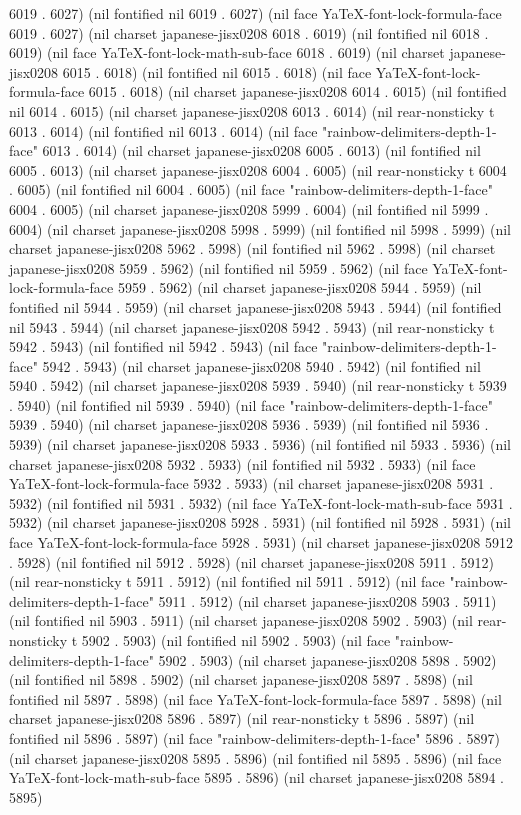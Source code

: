 6019 . 6027) (nil fontified nil 6019 . 6027) (nil face YaTeX-font-lock-formula-face 6019 . 6027) (nil charset japanese-jisx0208 6018 . 6019) (nil fontified nil 6018 . 6019) (nil face YaTeX-font-lock-math-sub-face 6018 . 6019) (nil charset japanese-jisx0208 6015 . 6018) (nil fontified nil 6015 . 6018) (nil face YaTeX-font-lock-formula-face 6015 . 6018) (nil charset japanese-jisx0208 6014 . 6015) (nil fontified nil 6014 . 6015) (nil charset japanese-jisx0208 6013 . 6014) (nil rear-nonsticky t 6013 . 6014) (nil fontified nil 6013 . 6014) (nil face "rainbow-delimiters-depth-1-face" 6013 . 6014) (nil charset japanese-jisx0208 6005 . 6013) (nil fontified nil 6005 . 6013) (nil charset japanese-jisx0208 6004 . 6005) (nil rear-nonsticky t 6004 . 6005) (nil fontified nil 6004 . 6005) (nil face "rainbow-delimiters-depth-1-face" 6004 . 6005) (nil charset japanese-jisx0208 5999 . 6004) (nil fontified nil 5999 . 6004) (nil charset japanese-jisx0208 5998 . 5999) (nil fontified nil 5998 . 5999) (nil charset japanese-jisx0208 5962 . 5998) (nil fontified nil 5962 . 5998) (nil charset japanese-jisx0208 5959 . 5962) (nil fontified nil 5959 . 5962) (nil face YaTeX-font-lock-formula-face 5959 . 5962) (nil charset japanese-jisx0208 5944 . 5959) (nil fontified nil 5944 . 5959) (nil charset japanese-jisx0208 5943 . 5944) (nil fontified nil 5943 . 5944) (nil charset japanese-jisx0208 5942 . 5943) (nil rear-nonsticky t 5942 . 5943) (nil fontified nil 5942 . 5943) (nil face "rainbow-delimiters-depth-1-face" 5942 . 5943) (nil charset japanese-jisx0208 5940 . 5942) (nil fontified nil 5940 . 5942) (nil charset japanese-jisx0208 5939 . 5940) (nil rear-nonsticky t 5939 . 5940) (nil fontified nil 5939 . 5940) (nil face "rainbow-delimiters-depth-1-face" 5939 . 5940) (nil charset japanese-jisx0208 5936 . 5939) (nil fontified nil 5936 . 5939) (nil charset japanese-jisx0208 5933 . 5936) (nil fontified nil 5933 . 5936) (nil charset japanese-jisx0208 5932 . 5933) (nil fontified nil 5932 . 5933) (nil face YaTeX-font-lock-formula-face 5932 . 5933) (nil charset japanese-jisx0208 5931 . 5932) (nil fontified nil 5931 . 5932) (nil face YaTeX-font-lock-math-sub-face 5931 . 5932) (nil charset japanese-jisx0208 5928 . 5931) (nil fontified nil 5928 . 5931) (nil face YaTeX-font-lock-formula-face 5928 . 5931) (nil charset japanese-jisx0208 5912 . 5928) (nil fontified nil 5912 . 5928) (nil charset japanese-jisx0208 5911 . 5912) (nil rear-nonsticky t 5911 . 5912) (nil fontified nil 5911 . 5912) (nil face "rainbow-delimiters-depth-1-face" 5911 . 5912) (nil charset japanese-jisx0208 5903 . 5911) (nil fontified nil 5903 . 5911) (nil charset japanese-jisx0208 5902 . 5903) (nil rear-nonsticky t 5902 . 5903) (nil fontified nil 5902 . 5903) (nil face "rainbow-delimiters-depth-1-face" 5902 . 5903) (nil charset japanese-jisx0208 5898 . 5902) (nil fontified nil 5898 . 5902) (nil charset japanese-jisx0208 5897 . 5898) (nil fontified nil 5897 . 5898) (nil face YaTeX-font-lock-formula-face 5897 . 5898) (nil charset japanese-jisx0208 5896 . 5897) (nil rear-nonsticky t 5896 . 5897) (nil fontified nil 5896 . 5897) (nil face "rainbow-delimiters-depth-1-face" 5896 . 5897) (nil charset japanese-jisx0208 5895 . 5896) (nil fontified nil 5895 . 5896) (nil face YaTeX-font-lock-math-sub-face 5895 . 5896) (nil charset japanese-jisx0208 5894 . 5895) 